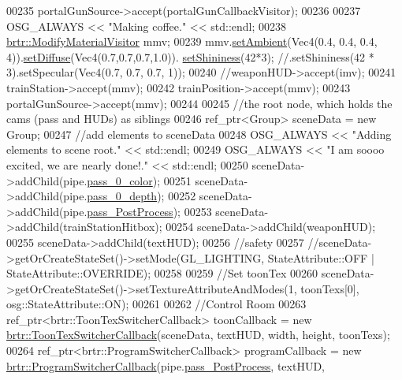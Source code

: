 \begin{DoxyCode}
00235     portalGunSource->accept(portalGunCallbackVisitor);
00236 
00237     OSG\_ALWAYS << \textcolor{stringliteral}{"Making coffee."} << std::endl;
00238     \hyperlink{classbrtr_1_1_modify_material_visitor}{brtr::ModifyMaterialVisitor} mmv;
00239     mmv.\hyperlink{classbrtr_1_1_modify_material_visitor_adfaa00524e765fdf3ddc5968187623cd}{setAmbient}(Vec4(0.4, 0.4, 0.4, 4)).\hyperlink{classbrtr_1_1_modify_material_visitor_a17748f6a7f41431832da66dd65e1c41f}{setDiffuse}(Vec4(0.7,0.7,0.7,1.0)).
      \hyperlink{classbrtr_1_1_modify_material_visitor_a698aa0c31f8c5add503d47bc9898eec3}{setShininess}(42*3); \textcolor{comment}{//.setShininess(42 * 3).setSpecular(Vec4(0.7, 0.7, 0.7, 1));}
00240     \textcolor{comment}{//weaponHUD->accept(imv);}
00241     trainStation->accept(mmv);
00242     trainPosition->accept(mmv);
00243     portalGunSource->accept(mmv);
00244 
00245     \textcolor{comment}{//the root node, which holds the cams (pass and HUDs) as siblings}
00246     ref\_ptr<Group> sceneData = \textcolor{keyword}{new} Group;
00247     \textcolor{comment}{//add elements to sceneData}
00248     OSG\_ALWAYS << \textcolor{stringliteral}{"Adding elements to scene root."} << std::endl;
00249     OSG\_ALWAYS << \textcolor{stringliteral}{"I am soooo excited, we are nearly done!."} << std::endl;
00250     sceneData->addChild(pipe.\hyperlink{structbrtr_1_1_rendering_pipeline_ae945030321a6b44f00266954c8c50bf3}{pass\_0\_color});
00251     sceneData->addChild(pipe.\hyperlink{structbrtr_1_1_rendering_pipeline_a18752632c1b557d283e523ebbc0443a0}{pass\_0\_depth});
00252     sceneData->addChild(pipe.\hyperlink{structbrtr_1_1_rendering_pipeline_aea2228e41f1e5c6db5d616c05ecc27fd}{pass\_PostProcess});  
00253     sceneData->addChild(trainStationHitbox);
00254     sceneData->addChild(weaponHUD);
00255     sceneData->addChild(textHUD);
00256     \textcolor{comment}{//safety}
00257     \textcolor{comment}{//sceneData->getOrCreateStateSet()->setMode(GL\_LIGHTING, StateAttribute::OFF |
       StateAttribute::OVERRIDE);}
00258 
00259     \textcolor{comment}{//Set toonTex}
00260     sceneData->getOrCreateStateSet()->setTextureAttributeAndModes(1, toonTexs[0], osg::StateAttribute::ON);
00261 
00262     \textcolor{comment}{//Control Room}
00263     ref\_ptr<brtr::ToonTexSwitcherCallback> toonCallback = \textcolor{keyword}{new} 
      \hyperlink{classbrtr_1_1_toon_tex_switcher_callback}{brtr::ToonTexSwitcherCallback}(sceneData, textHUD, width, height, toonTexs);
00264     ref\_ptr<brtr::ProgramSwitcherCallback> programCallback = \textcolor{keyword}{new} 
      \hyperlink{classbrtr_1_1_program_switcher_callback}{brtr::ProgramSwitcherCallback}(pipe.\hyperlink{structbrtr_1_1_rendering_pipeline_aea2228e41f1e5c6db5d616c05ecc27fd}{pass\_PostProcess}, textHUD, 

\end{DoxyCode}
